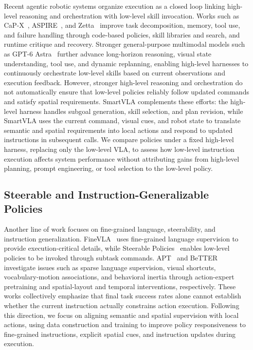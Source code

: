 Recent agentic robotic systems organize execution as a closed loop linking high-level reasoning and
orchestration with low-level skill invocation. Works such as CaP-X~\citep{fu2026capx},
ASPIRE~\citep{lu2026aspire}, and Zetta~\citep{ding2026zetta} improve task decomposition, memory,
tool use, and failure handling through code-based policies, skill libraries and search, and runtime
critique and recovery. Stronger general-purpose multimodal models such as GPT-6
Astra~\citep{openai2026gpt6astra} further advance long-horizon reasoning, visual state
understanding, tool use, and dynamic replanning, enabling high-level harnesses to continuously
orchestrate low-level skills based on current observations and execution feedback. However, stronger
high-level reasoning and orchestration do not automatically ensure that low-level policies reliably
follow updated commands and satisfy spatial requirements. SmartVLA complements these efforts: the
high-level harness handles subgoal generation, skill selection, and plan revision, while SmartVLA
uses the current command, visual cues, and robot state to translate semantic and spatial
requirements into local actions and respond to updated instructions in subsequent calls. We compare
policies under a fixed high-level harness, replacing only the low-level VLA, to assess how low-level
instruction execution affects system performance without attributing gains from high-level planning,
prompt engineering, or tool selection to the low-level policy.

\hypertarget{steerable-and-instruction-generalizable-policies}{%
\subsection{Steerable and Instruction-Generalizable
Policies}\label{steerable-and-instruction-generalizable-policies}}

Another line of work focuses on fine-grained language, steerability, and instruction generalization.
FineVLA~\citep{hu2026finevla} uses fine-grained language supervision to provide execution-critical
details, while Steerable Policies~\citep{chen2026steerable} enables low-level policies to be invoked
through subtask commands. APT~\citep{xu2026apt} and BeTTER~\citep{xu2026better} investigate issues
such as sparse language supervision, visual shortcuts, vocabulary-motion associations, and
behavioral inertia through action-expert pretraining and spatial-layout and temporal interventions,
respectively. These works collectively emphasize that final task success rates alone cannot
establish whether the current instruction actually constrains action execution. Following this
direction, we focus on aligning semantic and spatial supervision with local actions, using data
construction and training to improve policy responsiveness to fine-grained instructions, explicit
spatial cues, and instruction updates during execution.

